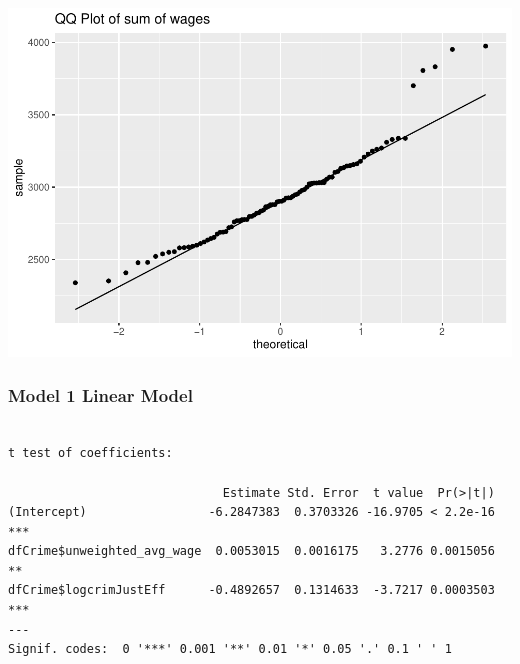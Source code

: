 \documentclass[]{article}
\newenvironment{Shaded}{}{}
\newcommand{\DataTypeTok}[1]{#1}
\newcommand{\DecValTok}[1]{#1}
\newcommand{\KeywordTok}[1]{\textcolor[rgb]{0.00,0.00,1.00}{#1}}
\newcommand{\NormalTok}[1]{#1}
\newcommand{\OperatorTok}[1]{#1}
\newcommand{\StringTok}[1]{\textcolor[rgb]{0.00,0.50,0.50}{#1}}
\begin{document}
\includegraphics{Bagnard_Gaustad_Hartman_Leung_Lab_3_files/figure-latex/unnamed-chunk-79-2.pdf}

\hypertarget{model-1-linear-model}{%
\subsubsection{Model 1 Linear Model}\label{model-1-linear-model}}

\begin{Shaded}
\end{Shaded}

\begin{verbatim}

t test of coefficients:

                              Estimate Std. Error  t value  Pr(>|t|)    
(Intercept)                 -6.2847383  0.3703326 -16.9705 < 2.2e-16 ***
dfCrime$unweighted_avg_wage  0.0053015  0.0016175   3.2776 0.0015056 ** 
dfCrime$logcrimJustEff      -0.4892657  0.1314633  -3.7217 0.0003503 ***
---
Signif. codes:  0 '***' 0.001 '**' 0.01 '*' 0.05 '.' 0.1 ' ' 1
\end{verbatim}
\end{document}
